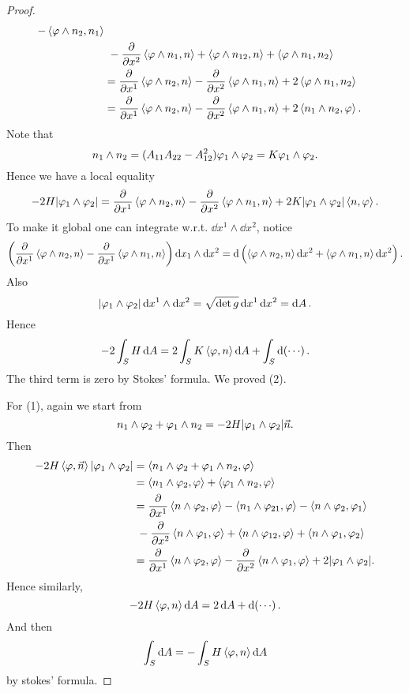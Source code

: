 \begin{proof}
\begin{align*}
        -\left<\varphi\wedge n_2,n_1\right> \\
        &\ -\pdv{x^2}\left<\varphi\wedge n_1,n\right> +\left<\varphi\wedge n_{12},n\right> 
        +\left<\varphi\wedge n_1,n_2\right> \\
        &=\pdv{x^1}\left<\varphi\wedge n_2,n\right> -\pdv{x^2}\left<\varphi\wedge n_1,
        n\right> +2\left<\varphi\wedge n_1,n_2\right> \\
        &=\pdv{x^1}\left<\varphi\wedge n_2,n\right> -\pdv{x^2}\left<\varphi\wedge n_1,
        n\right> +2\left<n_1\wedge n_2,\varphi\right> 
    .\end{align*}
    Note that \[
        n_1\wedge n_2=(A_{11}A_{22}-A_{12}^2)\varphi_1\wedge\varphi_2=K\varphi_1\wedge\varphi_2
    .\] Hence we have a local equality \[
        -2H|\varphi_1\wedge \varphi_2|=\pdv{x^1}\left<\varphi\wedge n_2,n\right> 
        -\pdv{x^2}\left<\varphi\wedge n_1,n\right> +2K|\varphi_1\wedge \varphi_2|
        \left<n,\varphi\right> 
    .\] To make it global one can integrate w.r.t. \(\dd{x^1}\wedge \dd{x^2}\),
    notice \[
        \left(\pdv{x^1}\left<\varphi\wedge n_2,n\right> -\pdv{x^1}\left<\varphi\wedge n_1,
        n\right> \right)\dd{x_1}\wedge \dd{x^2}
        =\dd\left(\left<\varphi\wedge n_2,n\right> \dd{x^2}+\left<\varphi\wedge n_1,
        n\right> \dd{x^2}\right)
    .\] Also \[
        |\varphi_1\wedge \varphi_2|\dd{x^1}\wedge \dd{x^2}
        =\sqrt{\det g}\dd{x^1}\dd{x^2}=\dd{A}
    .\] Hence \[
        -2\int_{S}H\dd{A}=2\int_{S}K\left<\varphi,n\right> \dd{A}
        +\int_{S}\dd(\cdots)
    .\] The third term is zero by Stokes' formula. We proved (2).
    
    For (1), again we start from \[
        n_1\wedge \varphi_2+\varphi_1\wedge n_2=-2H|\varphi_1\wedge \varphi_2|\vec{n}
    .\] Then \begin{align*}
        -2H\left<\varphi,\vec{n}\right> |\varphi_1\wedge \varphi_2|&=
        \left<n_1\wedge \varphi_2+\varphi_1\wedge n_2,\varphi\right> \\
        &=\left<n_1\wedge \varphi_2,\varphi\right> +\left<\varphi_1\wedge n_2,\varphi\right> \\
        &=\pdv{x^1}\left<n\wedge \varphi_2,\varphi\right> -\left<n_1\wedge \varphi_{21},
        \varphi\right> -\left<n\wedge \varphi_2,\varphi_1\right> \\
        &\ -\pdv{x^2}\left<n\wedge \varphi_1,\varphi\right> +\left<n\wedge \varphi_{12},
        \varphi\right> +\left<n\wedge \varphi_1,\varphi_2\right> \\
        &=\pdv{x^1}\left<n\wedge \varphi_2,\varphi\right> -\pdv{x^2}\left<n\wedge \varphi_1,
        \varphi\right> +2|\varphi_1\wedge \varphi_2|
    .\end{align*}
    Hence similarly, \[
        -2H\left<\varphi,n\right> \dd{A}=2\dd{A}+\dd(\cdots )
    .\] And then \[
        \int_{S}\dd{A}=-\int_{S}H\left<\varphi,n\right> \dd{A}
    \] by stokes' formula.
\end{proof}

